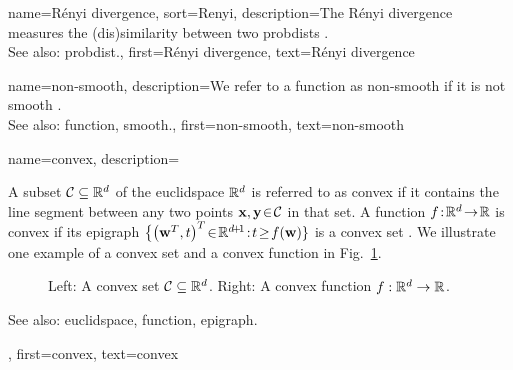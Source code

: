 {name={R\'enyi divergence}, 
	sort={Renyi},
	description={The R\'enyi divergence measures the (dis)similarity 
		between two \glspl{probdist} \cite{RenyiInfo95}.
				\\
		See also: \gls{probdist}.}, 
	first={R\'enyi divergence}, 
	text={R\'enyi divergence}
} 

{name={non-smooth},
	description={We refer to a \gls{function} as non-smooth if it is not 
		\gls{smooth} \cite{nesterov04}.
				\\
		See also: \gls{function}, \gls{smooth}.},
	first={non-smooth},
	text={non-smooth}
}

{name={convex},
	description={A subset $\mathcal{C} \subseteq \mathbb{R}^{d}$ of the 
		\gls{euclidspace} $\mathbb{R}^{d}$ is referred to as convex if it contains 
		the line segment between any two points ${\bf x}, {\bf y}\!\in\!\mathcal{C}$ in that set. A \gls{function}  
		$f\!:\!\mathbb{R}^{d}\!\rightarrow\!\mathbb{R}$ 
		is convex if its \gls{epigraph} $\big\{ \big( \weights^{T},t \big)^{T}\!\in\!\mathbb{R}^{\dimlocalmodel\!+\!1}\!:\!t\!\geq\!f(\weights) \}$ 
		is a convex set \cite{BoydConvexBook}. We illustrate one example of a convex set 
		and a convex \gls{function} in Fig.\ \ref{fig_convex_set_function_dict}. 
		\begin{figure}[H]
		\begin{center}
			\vspace*{-8mm}
			\end{center}
			\caption{Left: A convex set $\mathcal{C} \subseteq \mathbb{R}^{d}$. 
				Right: A convex \gls{function} $f: \mathbb{R}^{d} \rightarrow \mathbb{R}$.
				\label{fig_convex_set_function_dict}}
		\end{figure}
		See also: \gls{euclidspace}, \gls{function}, \gls{epigraph}.},
	first={convex},
	text={convex}
}


